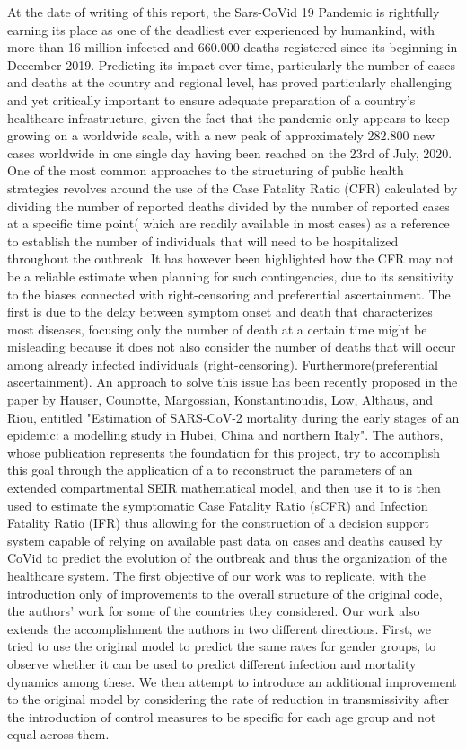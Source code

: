 \documentclass[../main.tex]{subfiles}
\begin{document}

At the date of writing of this report, the Sars-CoVid 19 Pandemic is rightfully earning its place as one of the deadliest ever experienced by humankind, with more than 16 million infected and 660.000 deaths registered since its beginning in December 2019. Predicting its impact over time, particularly the number of cases and deaths at the country and regional level, has proved particularly challenging and yet critically important to ensure adequate preparation of a country's healthcare infrastructure, given the fact that the pandemic only appears to keep growing on a worldwide scale, with a new peak of approximately 282.800 new cases worldwide in one single day having been reached on the 23rd of July, 2020.
One of the most common approaches to the structuring of public health strategies revolves around the use of the Case Fatality Ratio (CFR) calculated by dividing the number of reported deaths divided by the number of reported cases at a specific time point( which are readily available in most cases) as a reference to establish the number of individuals that will need to be hospitalized throughout the outbreak. It has however been highlighted how the CFR may not be a reliable estimate when planning for such contingencies, due to its sensitivity to the biases connected with right-censoring and preferential ascertainment. The first is due to the delay between symptom onset and death that characterizes most diseases, focusing only the number of death at a certain time might be misleading because it does not also consider the number of deaths that will occur among already infected individuals (right-censoring). Furthermore(preferential ascertainment).
An approach to solve this issue has been recently proposed in the paper by Hauser, Counotte, Margossian, Konstantinoudis, Low, Althaus, and Riou, entitled  "Estimation of SARS-CoV-2 mortality during the early stages of an epidemic: a modelling study in Hubei, China and northern Italy". The authors, whose publication represents the foundation for this project, try to accomplish this goal through the application of a to reconstruct the parameters of an extended compartmental SEIR mathematical model, and then use it to is then used to estimate the symptomatic Case Fatality Ratio (sCFR) and Infection Fatality Ratio (IFR) thus allowing for the construction of a decision support system capable of relying on available past data on cases and deaths caused by CoVid to predict the evolution of the outbreak and thus the organization of the healthcare system.
The first objective of our work was to replicate, with the introduction only of improvements to the overall structure of the original code, the authors' work for some of the countries they considered.
Our work also extends the accomplishment the authors in two different directions. First, we tried to use the original model to predict the same rates for gender groups, to observe whether it can be used to predict different infection and mortality dynamics among these.
We then attempt to introduce an additional improvement to the original model by considering the rate of reduction in transmissivity after the introduction of control measures to be specific for each age group and not equal across them. 
\end{document}
